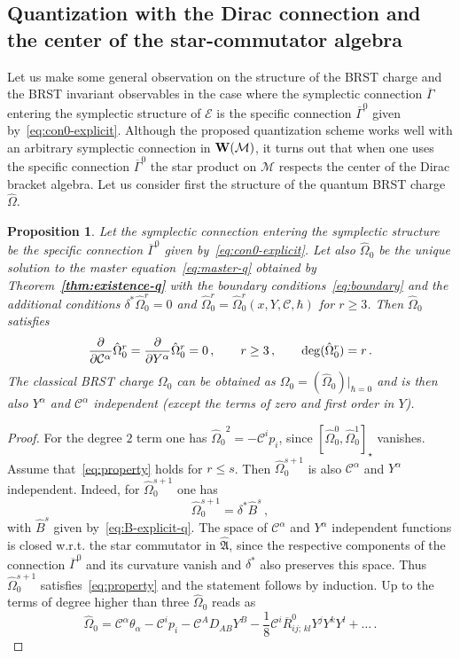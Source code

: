 \documentclass[a4paper,11pt]{amsart}
\newtheorem{prop}[thm]{Proposition}
\numberwithin{thm}{section} %
\numberwithin{equation}{section} %
\numberwithin{figure}{section} %
\newcommand{\bref}[1]{{\bf \ref{#1}}}
\newcommand{\qcommut}[2]{[#1,#2]_\star}
\renewcommand{\deg}[1]{{\rm deg}(#1)}
\renewcommand{\:}{{\rm\, :\,}}
\def\bar{\overline}
\def\d{\partial}
\newcommand{\dl}[1]{\displaystyle\frac{{\d}}{\d #1}}
\def\cc{{\mathcal C}}
\def\manM{{\mathcal M}}
\def\qA{{\hat{\mathfrak A}}}
\def\E{{ \mathcal E}}
\def\W{{\bf W}}
\def\con{{\bar\Gamma}}
\begin{document}
\subsection{Quantization with the Dirac connection and the center of
  the star-commutator algebra}\label{subsec:special}
Let us make some general observation on the structure of the BRST
charge and the BRST invariant observables in the case where the
symplectic connection $\con$ entering the symplectic structure
of $\E$ is the specific connection $\con^0$ given by~\eqref{eq:con0-explicit}.
Although the proposed quantization scheme works well with an
arbitrary symplectic connection in $\W(\manM)$, it
turns out that when one uses the specific connection $\con^0$
the star product on $\manM$ respects the center of the
Dirac bracket algebra. Let us
consider first the structure of the quantum BRST charge
$\hat\Omega$.


\begin{prop}\label{prop:Omega-special}
Let the symplectic connection entering the symplectic structure
be the specific connection $\con^0$ given by~\eqref{eq:con0-explicit}.
Let also ${\hat\Omega}_0$ be the unique solution to the master
equation~\eqref{eq:master-q} obtained by
Theorem~\bref{thm:existence-q} with the boundary
conditions~\eqref{eq:boundary} and the additional conditions
$\delta^*{\hat\Omega}_0^r=0$ and
${\hat\Omega}_0^r={\hat\Omega}_0^r(x,Y,\cc,\hbar)$ for $r \geq 3$.
Then ${\hat\Omega}_0$ satisfies
\begin{equation}
\label{eq:property}
  \dl{\cc^\alpha}{\hat\Omega}_0^r=\dl{Y^\alpha}{\hat\Omega}_0^r=0\,,
\qquad r \geq 3\,, \qquad \deg{{\hat\Omega}^r_0}=r\,.
\end{equation}
The classical BRST charge $\Omega_0$ can be obtained as
$\Omega_0=({\hat\Omega}_0){\bigr|}_{\hbar=0}$ and is then also
$Y^\alpha$ and $\cc^\alpha$ independent (except the terms of zero and
first order in $Y$).
\end{prop}
\begin{proof}
For the degree $2$ term one has ${\hat\Omega_0}^2=-\cc^i p_i$,
since $\qcommut{{\hat\Omega}_0^0}{{\hat\Omega}_0^1}$ vanishes.
Assume that~\eqref{eq:property} holds for $r\leq s$.  Then
${\hat\Omega}_0^{s+1}$ is also $\cc^\alpha$ and
$Y^\alpha$ independent.  Indeed, for ${\hat\Omega}_0^{s+1}$ one has
\begin{equation}
{\hat\Omega}_0^{s+1}=\delta^*{\hat B}^s\,, 
\end{equation}
with ${\hat B}^s$ given by~\eqref{eq:B-explicit-q}. 
The space of $\cc^\alpha$ and $Y^\alpha$ independent functions is
closed w.r.t. the star commutator in $\qA$, since the respective
components of the connection $\con^0$ and its curvature vanish and
$\delta^*$ also preserves this space. Thus ${\hat\Omega}_0^{s+1}$
satisfies~\eqref{eq:property} and the statement follows by
induction.  Up to the terms of degree higher than three
$\hat\Omega_0$ reads as
\begin{equation}
  \label{eq:3}
{\hat\Omega}_0=\cc^\alpha \theta_\alpha - \cc^i p_i-\cc^A D_{AB}Y^B
-\frac{1}{8} \cc^i {\bar R}^0_{ij;\,kl}Y^jY^kY^l+\ldots\,.
\end{equation}
\end{proof}
\end{document}
